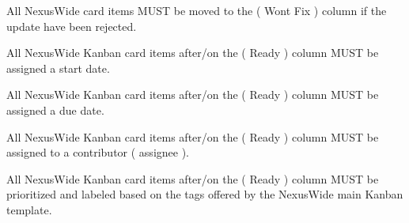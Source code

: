 \documentclass[13pt]{scrarticle}
\newcommand{\nexusrule}[1]{\Tribar[1][white][yellow][red]\color{blue} #1}
\begin{document}
      \nexusrule{ All NexusWide card items MUST be moved to the ( Wont Fix ) column if the update have been rejected.} \newline

      \nexusrule{ All NexusWide Kanban card items after/on the ( Ready ) column MUST be assigned a start date.} \newline

      \nexusrule{ All NexusWide Kanban card items after/on the ( Ready ) column MUST be assigned a due date.} \newline

      \nexusrule{ All NexusWide Kanban card items after/on the ( Ready ) column MUST be assigned to a contributor ( assignee ).} \newline

      \nexusrule{ All NexusWide Kanban card items after/on the ( Ready ) column MUST be prioritized and labeled based on the tags offered by the NexusWide main Kanban template.} \newline
\end{document}
